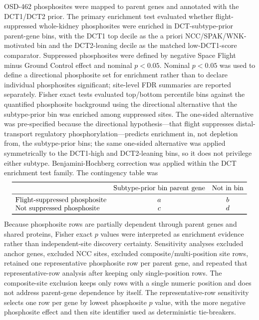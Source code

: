 \documentclass[11pt]{article}
\begin{document}
OSD-462 phosphosites were mapped to parent genes and annotated with the DCT1/DCT2 prior. The primary enrichment test evaluated whether flight-suppressed whole-kidney phosphosites were enriched in DCT-subtype-prior parent-gene bins, with the DCT1 top decile as the a priori NCC/SPAK/WNK-motivated bin and the DCT2-leaning decile as the matched low-DCT1-score comparator. Suppressed phosphosites were defined by negative Space Flight minus Ground Control effect and nominal $p<0.05$. Nominal $p<0.05$ was used to define a directional phosphosite set for enrichment rather than to declare individual phosphosites significant; site-level FDR summaries are reported separately. Fisher exact tests evaluated top/bottom percentile bins against the quantified phosphosite background using the directional alternative that the subtype-prior bin was enriched among suppressed sites. The one-sided alternative was pre-specified because the directional hypothesis---that flight suppresses distal-transport regulatory phosphorylation---predicts enrichment in, not depletion from, the subtype-prior bins; the same one-sided alternative was applied symmetrically to the DCT1-high and DCT2-leaning bins, so it does not privilege either subtype. Benjamini-Hochberg correction was applied within the DCT enrichment test family. The contingency table was
\[
\begin{array}{lcc}
\toprule
& \text{Subtype-prior bin parent gene} & \text{Not in bin} \\
\midrule
\text{Flight-suppressed phosphosite} & a & b \\
\text{Not suppressed phosphosite} & c & d \\
\bottomrule
\end{array}
\]
Because phosphosite rows are partially dependent through parent genes and shared proteins, Fisher exact $p$ values were interpreted as enrichment evidence rather than independent-site discovery certainty. Sensitivity analyses excluded anchor genes, excluded NCC sites, excluded composite/multi-position site rows, retained one representative phosphosite row per parent gene, and repeated that representative-row analysis after keeping only single-position rows. The composite-site exclusion keeps only rows with a single numeric position and does not address parent-gene dependence by itself. The representative-row sensitivity selects one row per gene by lowest phosphosite $p$ value, with the more negative phosphosite effect and then site identifier used as deterministic tie-breakers.
\end{document}
